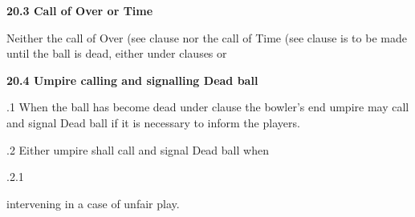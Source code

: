 \documentclass[12pt]{article}
\begin{document}
\vspace{\baselineskip}
{\fontsize{11pt}{13.2pt}\selectfont \textbf{20.3 \tabto{0.47in} Call of Over or Time}\par}\par


\vspace{\baselineskip}
\begin{adjustwidth}{0.0in}{0.14in}
{\fontsize{9pt}{10.8pt}\selectfont Neither the call of Over (see clause nor the call of Time (see clause is to be made until the ball is dead, either under clauses or \par}\par

\end{adjustwidth}


\vspace{\baselineskip}
{\fontsize{11pt}{13.2pt}\selectfont \textbf{20.4 \tabto{0.47in} Umpire calling and signalling Dead ball}\par}\par


\vspace{\baselineskip}
\begin{adjustwidth}{0.5in}{0.03in}
{\fontsize{9pt}{10.8pt}.1 \tabto{0.49in} When the ball has become dead under clause the bowler’s end umpire may call and signal Dead ball if it is necessary to inform the players.\par}\par

\end{adjustwidth}


\vspace{\baselineskip}
{\fontsize{9pt}{10.8pt}.2 \tabto{0.49in} Either umpire shall call and signal Dead ball when\par}\par


\vspace{\baselineskip}
\begin{adjustwidth}{0.49in}{0.0in}
{\fontsize{9pt}{10.8pt}.2.1 \tabto{1.17in} {\fontsize{8pt}{9.6pt}\selectfont intervening in a case of unfair play.\par}\par}\par

\end{adjustwidth}


\vspace{\baselineskip}
\end{document}
